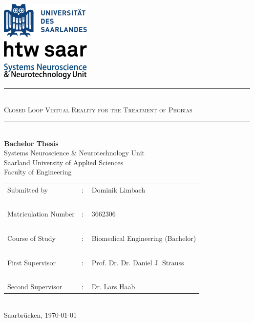 \documentclass[
    12pt,
    a4paper,
	chapterprefix=false,
	parskip=full,
	headings=normal,
	numbers=noenddot
]{scrreprt}
\begin{document}
\begin{flushright}
	\includegraphics[width=4.5cm]{images/logo}
\end{flushright}

\begin{center}
	\vspace{\fill}
	\rule{\textwidth}{1pt}
	~\\
	\Large
	\textsc{Closed Loop Virtual Reality for the Treatment of Phobias}\\
    \rule{\textwidth}{1pt}\\
    \vspace{\fill}
    \Large
	\textbf{Bachelor Thesis}\\
	\vspace{\fill}
	\normalsize
	Systems Neuroscience \& Neurotechnology Unit\\
	Saarland University of Applied Sciences\\
	Faculty of Engineering\\
    \vspace{\fill}
	\begin{tabular}{l l l}
		Submitted by & : & Dominik Limbach\\
		~ & ~ & ~\\
		Matriculation Number & : & 3662306\\
		~ & ~ & ~\\
		Course of Study & : & Biomedical Engineering (Bachelor)\\
		~ & ~ & ~\\
		First Supervisor & : & Prof. Dr. Dr. Daniel J. Strauss\\
		~ & ~ & ~\\
		Second Supervisor & : & Dr. Lars Haab\\
	\end{tabular}
	~\\
	\vspace{\fill}
	Saarbrücken, \today
\end{center}

\thispagestyle{empty}
\clearpage
\end{document}
